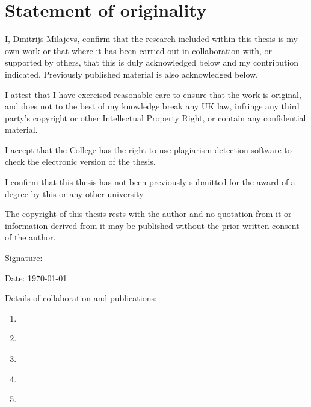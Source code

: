\chapter*{Statement of originality}

I, Dmitrijs Milajevs, confirm that the research included within this thesis is my own work or that where it has been carried out in collaboration with, or supported by others, that this is duly acknowledged below and my contribution indicated. Previously published material is also acknowledged below.

I attest that I have exercised reasonable care to ensure that the work is original, and does not to the best of my knowledge break any UK law, infringe any third party’s copyright or other Intellectual Property Right, or contain any confidential material.

I accept that the College has the right to use plagiarism detection software to check the electronic version of the thesis.

I confirm that this thesis has not been previously submitted for the award of a degree by this or any other university.

The copyright of this thesis rests with the author and no quotation from it or information derived from it may be published without the prior written consent of the author.

Signature:

Date: \today

Details of collaboration and publications:
\begin{enumerate}
\item \citet*{milajevs-purver:2014:CVSC}
\item \citet*{milajevs-EtAl:2014:EMNLP2014}
\item \citet*{Milajevs:2015:IMN:2808194.2809448}
\item \citet*{milajevs-sadrzadeh-purver:2016:ACL-SRW}
\item \citet*{milajevs-griffiths:2016:repeval}
\end{enumerate}

